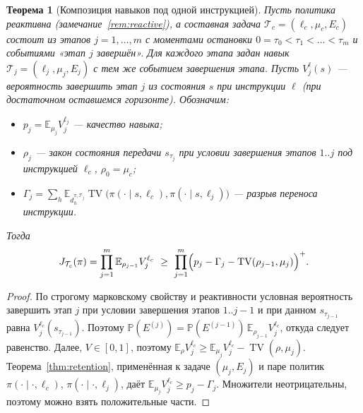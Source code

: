 \documentclass[11pt,a4paper]{article}
\theoremstyle{plain}
\newtheorem{theorem}{Теорема}[section]
\theoremstyle{definition}
\theoremstyle{remark}
\newcommand{\E}{\mathbb{E}}
\newcommand{\PP}{\mathbb{P}}
\DeclareMathOperator{\TV}{TV}
\newcommand{\cT}{\mathcal{T}}
\begin{document}
\begin{theorem}[Композиция навыков под одной инструкцией]\label{thm:composition}
Пусть политика реактивна (замечание~\ref{rem:reactive}), а составная задача $\cT_c=(\ell_c,\mu_c,E_c)$ состоит из этапов $j=1,\dots,m$ с моментами остановки $0=\tau_0<\tau_1<\dots<\tau_m$ и событиями «этап $j$ завершён». Для каждого этапа задан навык $\cT_j=(\ell_j,\mu_j,E_j)$ с тем же событием завершения этапа. Пусть $V^\ell_j(s)$ --- вероятность завершить этап $j$ из состояния $s$ при инструкции $\ell$ (при достаточном оставшемся горизонте). Обозначим:
\begin{itemize}
\item $p_j=\E_{\mu_j}V^{\ell_j}_j$ --- качество навыка;
\item $\rho_j$ --- закон состояния передачи $s_{\tau_j}$ при условии завершения этапов $1..j$ под инструкцией $\ell_c$, $\rho_0=\mu_c$;
\item $\Gamma_j=\sum_h\E_{d^{\pi,\cT_j}_h}\TV\bigl(\pi(\cdot\mid s,\ell_c),\pi(\cdot\mid s,\ell_j)\bigr)$ --- разрыв переноса инструкции.
\end{itemize}
Тогда
\[
J_{\cT_c}(\pi)=\prod_{j=1}^m\E_{\rho_{j-1}}V^{\ell_c}_j\ \ge\ \prod_{j=1}^m\Bigl(p_j-\Gamma_j-\TV(\rho_{j-1},\mu_j)\Bigr)^+ .
\]
\end{theorem}
\begin{proof}
По строгому марковскому свойству и реактивности условная вероятность завершить этап $j$ при условии завершения этапов $1..j-1$ и при данном $s_{\tau_{j-1}}$ равна $V^{\ell_c}_j(s_{\tau_{j-1}})$. Поэтому
$\PP(E^{(j)})=\PP(E^{(j-1)})\,\E_{\rho_{j-1}}V^{\ell_c}_j$, откуда следует равенство. Далее, $V\in[0,1]$, поэтому $\E_{\rho}V^{\ell_c}_j\ge\E_{\mu_j}V^{\ell_c}_j-\TV(\rho,\mu_j)$. Теорема~\ref{thm:retention}, применённая к задаче $(\mu_j,E_j)$ и паре политик $\pi(\cdot\mid\cdot,\ell_c)$, $\pi(\cdot\mid\cdot,\ell_j)$, даёт $\E_{\mu_j}V^{\ell_c}_j\ge p_j-\Gamma_j$. Множители неотрицательны, поэтому можно взять положительные части.
\end{proof}
\end{document}
